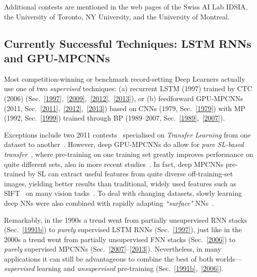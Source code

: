 \documentclass[letterpaper]{article}
\begin{document}
\begin{CJK*}{UTF8}{gbsn}
Additional contests are mentioned in the web pages of
the Swiss AI Lab IDSIA,
the University of Toronto,
NY University,
and the University of Montreal.


\subsection{Currently Successful Techniques: LSTM RNNs and GPU-MPCNNs}
\label{dominant}

Most competition-winning or benchmark record-setting Deep Learners actually use one of two {\em supervised} techniques: (a) recurrent LSTM (1997)  trained by CTC (2006) (Sec.~\ref{1997},~\ref{2009},~\ref{2012},~\ref{2013}), or (b) 
 feedforward GPU-MPCNNs (2011, Sec.~\ref{2011},~\ref{2012},~\ref{2013})
based on CNNs (1979, Sec.~\ref{1979}) with MP (1992, Sec.~\ref{1999}) 
trained through BP (1989--2007, Sec.~\ref{1989},~\ref{2007}).

Exceptions include two 2011 contests~\citep{goodfellow2011,transfer2011,goodfellow:2012icml} specialised on {\em Transfer 
Learning} from one dataset to another~\citep[e.g.,][]{caruana1997,Schmidhuber:04oops,transfer2010}.
However, deep GPU-MPCNNs do allow for {\em pure SL-based transfer}~\citep{Ciresan:2012a}, 
where pre-training
on one training set greatly improves performance on quite different sets,
also in more recent studies~\citep{oquab2013,donahue2013}. 
In fact, deep MPCNNs pre-trained by SL  can extract useful 
features from quite diverse off-training-set images, yielding better results than traditional, 
widely used features 
such as SIFT~\citep{Lowe:1999,Lowe:04} on many vision tasks~\citep{razavian2014}.
To deal with changing datasets, 
slowly learning deep NNs were also combined with  
rapidly adapting {\em ``surface"} NNs~\citep{kak2010}.


Remarkably, 
in the 1990s a trend went from partially unsupervised RNN stacks (Sec.~\ref{1991b}) to {\em purely} supervised LSTM RNNs (Sec.~\ref{1997}), just like in the 2000s a trend went from partially unsupervised FNN stacks (Sec.~\ref{2006}) to {\em purely} supervised MPCNNs 
(Sec.~\ref{2007}--\ref{2013}).
Nevertheless, in many applications it can still be advantageous to combine the best of both worlds---{\em supervised} learning and {\em unsupervised} pre-training (Sec.~\ref{1991b},~\ref{2006}).




\end{CJK*}
\end{document}
